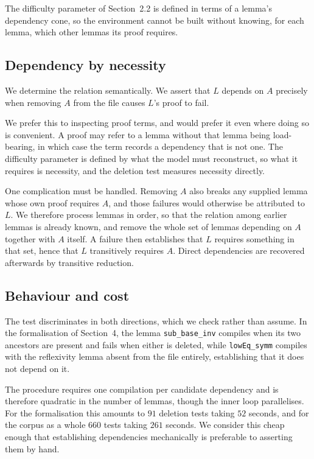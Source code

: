 \documentclass[11pt]{article}
\begin{document}
The difficulty parameter of Section~2.2 is defined in terms of a lemma's
dependency cone, so the environment cannot be built without knowing, for each
lemma, which other lemmas its proof requires.

\subsection{Dependency by necessity}

We determine the relation semantically. We assert that $L$ depends on $A$
precisely when removing $A$ from the file causes $L$'s proof to fail.

We prefer this to inspecting proof terms, and would prefer it even where doing so
is convenient. A proof may refer to a lemma without that lemma being
load-bearing, in which case the term records a dependency that is not one. The
difficulty parameter is defined by what the model must reconstruct, so what it
requires is necessity, and the deletion test measures necessity directly.

One complication must be handled. Removing $A$ also breaks any supplied lemma
whose own proof requires $A$, and those failures would otherwise be attributed to
$L$. We therefore process lemmas in order, so that the relation among earlier
lemmas is already known, and remove the whole set of lemmas depending on $A$
together with $A$ itself. A failure then establishes that $L$ requires something
in that set, hence that $L$ transitively requires $A$. Direct dependencies are
recovered afterwards by transitive reduction.

\subsection{Behaviour and cost}

The test discriminates in both directions, which we check rather than assume. In
the formalisation of Section~4, the lemma \verb|sub_base_inv| compiles when its
two ancestors are present and fails when either is deleted, while
\verb|lowEq_symm| compiles with the reflexivity lemma absent from the file
entirely, establishing that it does not depend on it.

The procedure requires one compilation per candidate dependency and is therefore
quadratic in the number of lemmas, though the inner loop parallelises. For the
formalisation this amounts to $91$ deletion tests taking $52$ seconds, and for
the corpus as a whole $660$ tests taking $261$ seconds. We consider this cheap
enough that establishing dependencies mechanically is preferable to asserting
them by hand.
\end{document}
